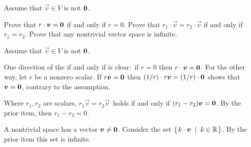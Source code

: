 
\begin{Exercise}[
name={},
title={}, 
difficulty=0,
origin={\cite{JH}}]
Assume that \( \vec{v}\in V \) is not \( \bm{0} \).

\Question Prove that \( r\cdot\bm{v}=\bm{0} \) if and only if \( r=0 \).
\Question Prove that \( r_1\cdot\vec{v}=r_2\cdot\vec{v} \) if
and only if \( r_1=r_2 \).
\Question Prove that any nontrivial vector space is infinite.

 
\end{Exercise}

\begin{Answer}

Assume that \( \vec{v}\in V \) is not \( \bm{0} \).
        
\Question One direction of the if and only if is clear:~if $r=0$
then $r\cdot\bm{v}=\bm{0}$.
For the other way, let \( r \) be a nonzero scalar.
If \( r\bm{v}=\bm{0} \) then
\( (1/r)\cdot r\bm{v}=(1/r)\cdot \bm{0} \) shows that
$\bm{v}=\bm{0}$,  contrary to the assumption.

\Question Where \( r_1,r_2 \) are scalars,
\( r_1\vec{v}=r_2\vec{v}\, \)
holds if and only if \( (r_1-r_2)\bm{v}=\bm{0} \).
By the prior item, then \( r_1-r_2=0 \).

\Question A nontrivial space has a vector
\( \bm{v}\neq\bm{0} \).
Consider the set \( \mbox{$\left\{\hspace{0.1em}k\cdot\bm{v}\;\;\middle|\;\; k\in\mathbb{R}\hspace{0.1em}\right\}$} \).
By the prior item this set is infinite.

\end{Answer}
